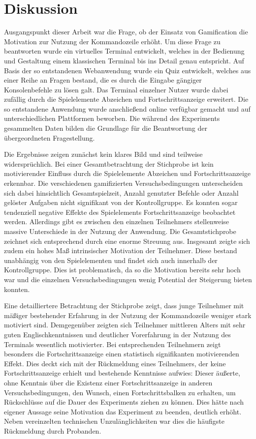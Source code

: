 \section{Diskussion}
Ausgangspunkt dieser Arbeit war die Frage, ob der Einsatz von Gamification die Motivation zur Nutzung der Kommandozeile erhöht. Um diese Frage zu beantworten wurde ein virtuelles Terminal entwickelt, welches in der Bedienung und Gestaltung einem klassischen Terminal bis ins Detail genau entspricht. Auf Basis der so entstandenen Webanwendung wurde ein Quiz entwickelt, welches aus einer Reihe an Fragen bestand, die es durch die Eingabe gängiger Konsolenbefehle zu lösen galt. Das Terminal einzelner Nutzer wurde dabei zufällig durch die Spielelemente Abzeichen und Fortschrittsanzeige erweitert. Die so entstandene Anwendung wurde anschließend online verfügbar gemacht und auf unterschiedlichen Plattformen beworben. Die während des Experiments gesammelten Daten bilden die Grundlage für die Beantwortung der übergeordneten Fragestellung. 

Die Ergebnisse zeigen zunächst kein klares Bild und sind teilweise widersprüchlich. Bei einer Gesamtbetrachtung der Stichprobe ist kein motivierender Einfluss durch die Spielelemente Abzeichen und Fortschrittsanzeige erkennbar. Die verschiedenen gamifizierten Versuchsbedingungen unterscheiden sich dabei hinsichtlich Gesamtspielzeit, Anzahl genutzter Befehle oder Anzahl gelöster Aufgaben nicht signifikant von der Kontrollgruppe. Es konnten sogar tendenziell negative Effekte des Spielelements Fortschrittsanzeige beobachtet werden. Allerdings gibt es zwischen den einzelnen Teilnehmers stellenweise massive Unterschiede in der Nutzung der Anwendung. Die Gesamtstichprobe zeichnet sich entsprechend durch eine enorme Streuung aus. Insgesamt zeigte sich zudem ein hohes Maß intrinsischer Motivation der Teilnehmer. Diese bestand unabhängig von den Spielelementen und findet sich auch innerhalb der Kontrollgruppe. Dies ist problematisch, da so die Motivation bereits sehr hoch war und die einzelnen Versuchsbedingungen wenig Potential der Steigerung bieten konnten.

Eine detailliertere Betrachtung der Stichprobe zeigt, dass junge Teilnehmer mit mäßiger bestehender Erfahrung in der Nutzung der Kommandozeile weniger stark motiviert sind. Demgegenüber zeigten sich Teilnehmer mittleren Alters mit sehr guten Englischkenntnissen und deutlicher Vorerfahrung in der Nutzung des Terminals wesentlich motivierter. Bei entsprechenden Teilnehmern zeigt besonders die Fortschrittsanzeige einen statistisch signifikanten motivierenden Effekt. Dies deckt sich mit der Rückmeldung eines Teilnehmers, der keine Fortschrittsanzeige erhielt und bestehende Kenntnisse aufwies: Dieser äußerte, ohne Kenntnis über die Existenz einer Fortschrittsanzeige in anderen Versuchsbedingungen, den Wunsch, einen Fortschrittsbalken zu erhalten, um Rückschlüsse auf die Dauer des Experiments ziehen zu können. Dies hätte nach eigener Aussage seine Motivation das Experiment zu beenden, deutlich erhöht. Neben vereinzelten technischen Unzulänglichkeiten war dies die häufigste Rückmeldung durch Probanden.

